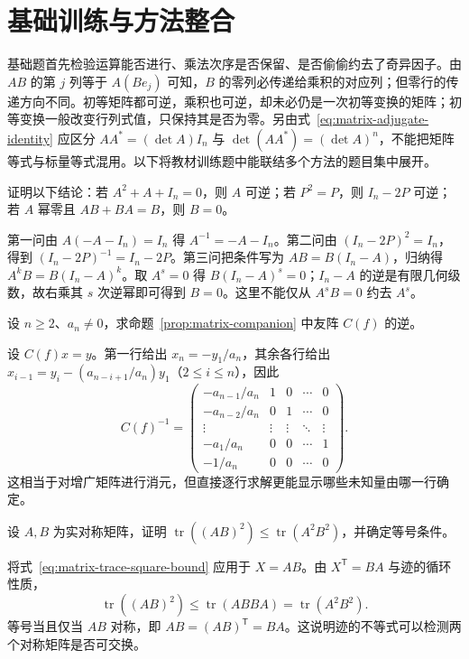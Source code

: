 \section{基础训练与方法整合}
\label{sec:matrix-training}

基础题首先检验运算能否进行、乘法次序是否保留、是否偷偷约去了奇异因子。由 $AB$ 的第 $j$ 列等于 $A(Be_j)$ 可知，$B$ 的零列必传递给乘积的对应列；但零行的传递方向不同。初等矩阵都可逆，乘积也可逆，却未必仍是一次初等变换的矩阵；初等变换一般改变行列式值，只保持其是否为零。另由式~\eqref{eq:matrix-adjugate-identity} 应区分 $AA^*=(\det A)I_n$ 与 $\det(AA^*)=(\det A)^n$，不能把矩阵等式与标量等式混用。以下将教材训练题中能联结多个方法的题目集中展开。

\begin{example}
\label{ex:matrix-training-polynomial}
证明以下结论：若 $A^2+A+I_n=0$，则 $A$ 可逆；若 $P^2=P$，则 $I_n-2P$ 可逆；若 $A$ 幂零且 $AB+BA=B$，则 $B=0$。
\end{example}
\begin{solve}
第一问由 $A(-A-I_n)=I_n$ 得 $A^{-1}=-A-I_n$。第二问由 $(I_n-2P)^2=I_n$，得到 $(I_n-2P)^{-1}=I_n-2P$。第三问把条件写为 $AB=B(I_n-A)$，归纳得 $A^kB=B(I_n-A)^k$。取 $A^s=0$ 得 $B(I_n-A)^s=0$；$I_n-A$ 的逆是有限几何级数，故右乘其 $s$ 次逆幂即可得到 $B=0$。这里不能仅从 $A^sB=0$ 约去 $A^s$。
\end{solve}

\begin{example}
\label{ex:matrix-training-companion-inverse}
设 $n\ge2$、$a_n\ne0$，求命题~\ref{prop:matrix-companion} 中友阵 $C(f)$ 的逆。
\end{example}
\begin{solve}
设 $C(f)x=y$。第一行给出 $x_n=-y_1/a_n$，其余各行给出 $x_{i-1}=y_i-(a_{n-i+1}/a_n)y_1$（$2\le i\le n$），因此
\[
 C(f)^{-1}=\begin{pmatrix}
 -a_{n-1}/a_n&1&0&\cdots&0\\
 -a_{n-2}/a_n&0&1&\cdots&0\\
 \vdots&\vdots&\vdots&\ddots&\vdots\\
 -a_1/a_n&0&0&\cdots&1\\
 -1/a_n&0&0&\cdots&0
 \end{pmatrix}.
\]
这相当于对增广矩阵进行消元，但直接逐行求解更能显示哪些未知量由哪一行确定。
\end{solve}

\begin{example}
\label{ex:matrix-training-trace-inequality}
设 $A,B$ 为实对称矩阵，证明 $\operatorname{tr}((AB)^2)\le\operatorname{tr}(A^2B^2)$，并确定等号条件。
\end{example}
\begin{solve}
将式~\eqref{eq:matrix-trace-square-bound} 应用于 $X=AB$。由 $X^{\mathsf T}=BA$ 与迹的循环性质，
\[
 \operatorname{tr}((AB)^2)\le\operatorname{tr}(ABBA)=\operatorname{tr}(A^2B^2).
\]
等号当且仅当 $AB$ 对称，即 $AB=(AB)^{\mathsf T}=BA$。这说明迹的不等式可以检测两个对称矩阵是否可交换。
\end{solve}

